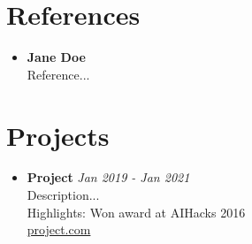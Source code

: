 \documentclass{article}
\newcommand{\entry}[2]{
    \textbf{#1} \hfill \textit{#2}
}
\begin{document}
\section*{References}
\begin{itemize}[leftmargin=*]
    \item \textbf{Jane Doe} \\
    Reference...
\end{itemize}

\section*{Projects}
\begin{itemize}[leftmargin=*]
    \item \entry{Project}{Jan 2019 - Jan 2021} \\
    Description... \\
    Highlights: Won award at AIHacks 2016 \\
    \href{https://project.com/}{project.com}
\end{itemize}
\end{document}
